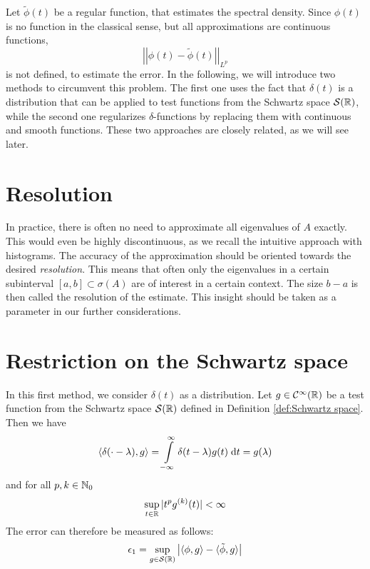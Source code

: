 Let $\tilde{\phi}(t)$ be a regular function, that estimates the spectral density.
Since $\phi(t)$ is no function in the classical sense, but all approximations are continuous functions,
\[
\left|\left|\phi(t) - \tilde{\phi}(t)\right|\right|_{L^p}
\]
is not defined, to estimate the error.
In the following, we will introduce two methods to circumvent this problem.
The first one uses the fact that $\delta(t)$ is a distribution that can be applied to test functions from the Schwartz space $\mathcal{S}(\mathbb{R})$,
while the second one regularizes $\delta$-functions by replacing them with continuous and smooth functions.
These two approaches are closely related, as we will see later.

\section{Resolution}
In practice, there is often no need to approximate all eigenvalues of $A$ exactly.
This would even be highly discontinuous, as we recall the intuitive approach with histograms.
The accuracy of the approximation should be oriented towards the desired \emph{resolution}.
This means that often only the eigenvalues in a certain subinterval $[a, b] \subset \sigma(A)$ are of interest in a certain context.
The size $b - a$ is then called the resolution of the estimate.
This insight should be taken as a parameter in our further considerations.

\section{Restriction on the Schwartz space}
In this first method, we consider $\delta(t)$ as a distribution.
Let $g \in \mathcal{C}^{\infty}(\mathbb{R})$ be a test function from the Schwartz space $\mathcal{S}(\mathbb{R})$ defined in Definition \ref{def:Schwartz space}.
Then we have
\[
\langle \delta(\cdot - \lambda), g \rangle = \int\limits_{-\infty}^{\infty} \delta(t - \lambda) g(t) \;\mathrm{d}t = g(\lambda)
\]
and for all $p, k \in \mathbb{N}_0$
\[
\sup_{t \in \mathbb{R}} |t^pg^{(k)}(t)| < \infty
\]
The error can therefore be measured as follows:
\[
\epsilon_1 = \sup_{g \in \mathcal{S}(\mathbb{R})} \left| \langle \phi, g \rangle - \langle \tilde{\phi}, g \rangle \right|
\]


